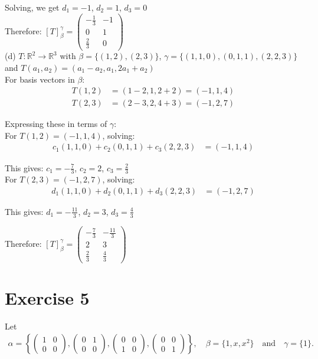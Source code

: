 \documentclass{article}
\begin{document}
Solving, we get $d_1 = -1$, $d_2 = 1$, $d_3 = 0$ \\

Therefore:
$[T]_\beta^\gamma = \begin{pmatrix} 
-\frac{1}{3} & -1 \\ 
0 & 1 \\ 
\frac{2}{3} & 0 
\end{pmatrix}$ \\

(d) $T : \mathbb{R}^2 \to \mathbb{R}^3$ with $\beta = \{(1,2),(2,3)\}$, $\gamma = \{(1,1,0),(0,1,1),(2,2,3)\}$ and $T(a_1, a_2) = (a_1 - a_2, a_1, 2a_1 + a_2)$ \\

For basis vectors in $\beta$:
\begin{align*}
T(1,2) &= (1-2, 1, 2+2) = (-1, 1, 4)\\
T(2,3) &= (2-3, 2, 4+3) = (-1, 2, 7)
\end{align*}

Expressing these in terms of $\gamma$: \\

For $T(1,2) = (-1, 1, 4)$, solving:
\begin{align*}
c_1(1,1,0) + c_2(0,1,1) + c_3(2,2,3) &= (-1,1,4)
\end{align*}

This gives: $c_1 = -\frac{7}{3}$, $c_2 = 2$, $c_3 = \frac{2}{3}$ \\

For $T(2,3) = (-1, 2, 7)$, solving:
\begin{align*}
d_1(1,1,0) + d_2(0,1,1) + d_3(2,2,3) &= (-1,2,7)
\end{align*}

This gives: $d_1 = -\frac{11}{3}$, $d_2 = 3$, $d_3 = \frac{4}{3}$

Therefore:
$[T]_\beta^\gamma = \begin{pmatrix} 
-\frac{7}{3} & -\frac{11}{3} \\ 
2 & 3 \\ 
\frac{2}{3} & \frac{4}{3} 
\end{pmatrix}$

\newpage

\section*{Exercise 5}
Let
\begin{align*}
\alpha = \left\{\left(\begin{matrix} 1 & 0 \\ 0 & 0 \end{matrix}\right), \left(\begin{matrix} 0 & 1 \\ 0 & 0 \end{matrix}\right), \left(\begin{matrix} 0 & 0 \\ 1 & 0 \end{matrix}\right), \left(\begin{matrix} 0 & 0 \\ 0 & 1 \end{matrix}\right)\right\}, \quad \beta = \{1, x, x^2\} \quad \text{and} \quad \gamma = \{1\}.
\end{align*}
\end{document}
